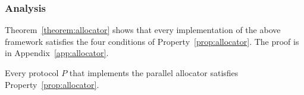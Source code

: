 \subsubsection*{Analysis}
Theorem~\ref{theorem:allocator} shows that every implementation
of the above framework satisfies the four conditions of Property~\ref{prop:allocator}.
The proof is in Appendix~\ref{app:allocator}.

\begin{theorem}
\label{theorem:allocator}
Every protocol $P$ that implements the parallel allocator
satisfies Property~\ref{prop:allocator}.
\end{theorem}
